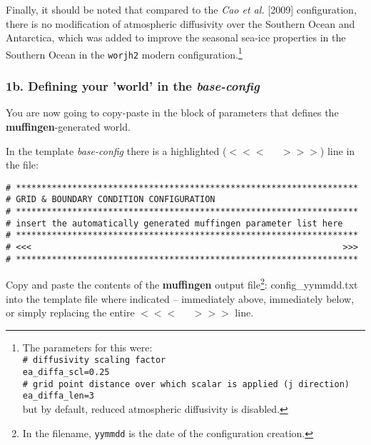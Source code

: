 \documentclass[11pt,fleqn]{book} %
\begin{document}
\begin{itemize}[noitemsep]
Finally, it should be noted that compared to the \textit{Cao et al.} [2009] configuration, there is no modification of atmospheric diffusivity over the Southern Ocean and Antarctica, which was added to improve the seasonal sea-ice properties in the Southern Ocean in the \texttt{worjh2} modern configuration.\footnote{The parameters for this were:
\\\texttt{\# diffusivity scaling factor}
\\\texttt{ea\_diffa\_scl=0.25}
\\\texttt{\# grid point distance over which scalar is applied (j direction)}
\\\texttt{ea\_diffa\_len=3}
\\but by default, reduced atmospheric diffusivity is disabled.}

\end{itemize}
\vspace{1mm}

%
\subsubsection{1b. Defining your 'world' in the \textit{base-config}}

You are now going to copy-paste in the block of parameters that defines the \textbf{muffingen}-generated world.

In the template \textit{base-config} there is a highlighted (\(<<<\;\;\;\;\;>>>\)) line in the  file:
\footnotesize\vspace{-2pt}\begin{verbatim}
# *******************************************************************
# GRID & BOUNDARY CONDITION CONFIGURATION
# *******************************************************************
# insert the automatically generated muffingen parameter list here
# *******************************************************************
# <<<                                                             >>>
# *******************************************************************
\end{verbatim}\vspace{-2pt}\normalsize

Copy and paste the contents of the \textbf{muffingen} output file\footnote{In the filename, \texttt{yymmdd} is the date of the configuration creation.}: \textsf{\footnotesize config\_yymmdd.txt}
into the template file where indicated -- immediately above, immediately below, or simply replacing the entire \(<<<\;\;\;\;\;>>>\) line.
\end{document}

